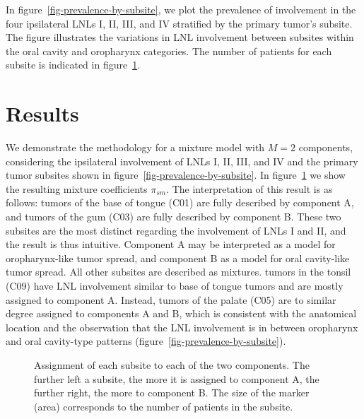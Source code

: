 \documentclass[11pt,twocolumn,twoside]{article}
\begin{document}
In figure~\ref{fig-prevalence-by-subsite}, we plot the prevalence of
involvement in the four ipsilateral LNLs I, II, III, and IV stratified
by the primary tumor's subsite. The figure illustrates the variations in
LNL involvement between subsites within the oral cavity and oropharynx
categories. The number of patients for each subsite is indicated in
figure~\ref{fig-cluster-assignments}.

\section{Results}\label{sec-results}

We demonstrate the methodology for a mixture model with \(M=2\)
components, considering the ipsilateral involvement of LNLs I, II, III,
and IV and the primary tumor subsites shown in
figure~\ref{fig-prevalence-by-subsite}. In
figure~\ref{fig-cluster-assignments} we show the resulting mixture
coefficients \(\pi_{sm}\). The interpretation of this result is as
follows: tumors of the base of tongue (C01) are fully described by
component A, and tumors of the gum (C03) are fully described by
component B. These two subsites are the most distinct regarding the
involvement of LNLs I and II, and the result is thus intuitive.
Component A may be interpreted as a model for oropharynx-like tumor
spread, and component B as a model for oral cavity-like tumor spread.
All other subsites are described as mixtures. tumors in the tonsil (C09)
have LNL involvement similar to base of tongue tumors and are mostly
assigned to component A. Instead, tumors of the palate (C05) are to
similar degree assigned to components A and B, which is consistent with
the anatomical location and the observation that the LNL involvement is
in between oropharynx and oral cavity-type patterns
(figure~\ref{fig-prevalence-by-subsite}).

\begin{figure}


\caption{\label{fig-cluster-assignments}Assignment of each subsite to
each of the two components. The further left a subsite, the more it is
assigned to component A, the further right, the more to component B. The
size of the marker (area) corresponds to the number of patients in the
subsite.}

\end{figure}%
\end{document}
